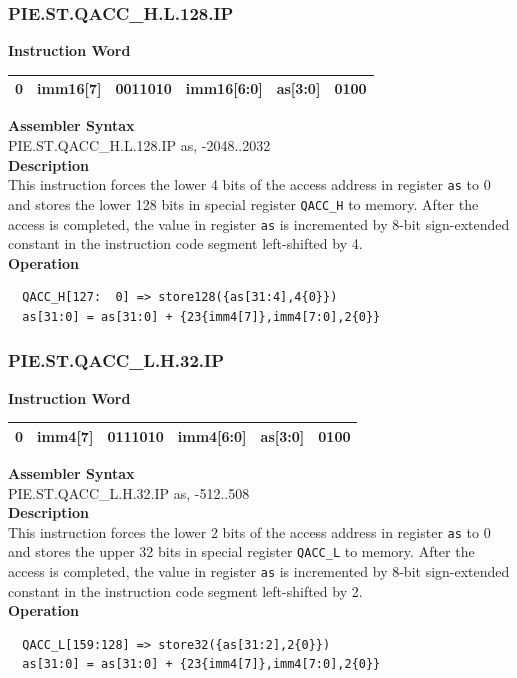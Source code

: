 \newpage
\subsubsection{PIE.ST.QACC\_H.L.128.IP}\label{instruction:PIESTQACCHL128IP}
\setlength\tabcolsep{6pt}
\textbf{Instruction Word} \\
\begin{tabular}{|c|c|c|c|c|c|}
	\hline
	0 & imm16[7] & 0011010 & imm16[6:0] & as[3:0] & 0100 \\
	\hline
\end{tabular}

\textbf{Assembler Syntax} \\
PIE.ST.QACC\_H.L.128.IP as, -2048..2032 \\
\textbf{Description} \\
This instruction forces the lower 4 bits of the access address in register \lstinline{as} to 0 and stores the lower 128 bits in special register \lstinline{QACC_H} to memory. After the access is completed, the value in register \lstinline{as} is incremented by 8-bit sign-extended constant in the instruction code segment left-shifted by 4.\\
\textbf{Operation}
\begin{lstlisting}
  QACC_H[127:  0] => store128({as[31:4],4{0}})
  as[31:0] = as[31:0] + {23{imm4[7]},imm4[7:0],2{0}}
\end{lstlisting}

\newpage
\subsubsection{PIE.ST.QACC\_L.H.32.IP}\label{instruction:PIESTQACCLH32IP}
\setlength\tabcolsep{6pt}
\textbf{Instruction Word} \\
\begin{tabular}{|c|c|c|c|c|c|}
	\hline
	0 & imm4[7] & 0111010 & imm4[6:0] & as[3:0] & 0100 \\
	\hline
\end{tabular}

\textbf{Assembler Syntax} \\
PIE.ST.QACC\_L.H.32.IP as, -512..508 \\
\textbf{Description} \\
This instruction forces the lower 2 bits of the access address in register \lstinline{as} to 0 and stores the upper 32 bits in special register \lstinline{QACC_L} to memory. After the access is completed, the value in register \lstinline{as} is incremented by 8-bit sign-extended constant in the instruction code segment left-shifted by 2.\\
\textbf{Operation}
\begin{lstlisting}
  QACC_L[159:128] => store32({as[31:2],2{0}})
  as[31:0] = as[31:0] + {23{imm4[7]},imm4[7:0],2{0}}
\end{lstlisting}

